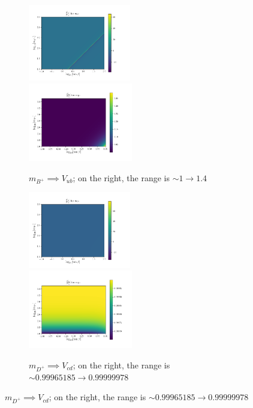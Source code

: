\documentclass[11pt]{article}
\begin{document}
\begin{figure}[H]
    \centering
    \begin{subfigure}[b]{\textwidth}
        \includegraphics[width=0.49\textwidth]{heatmaps/mB-rH0.png}
        \includegraphics[width=0.5\textwidth]{heatmaps/mB-rH1.png}
        \caption{$m_{B^+} \implies V_{ub}$; on the right, the range is $\sim1\to1.4$}
    \end{subfigure}
    \begin{subfigure}[b]{\textwidth}
        \includegraphics[width=0.49\textwidth]{heatmaps/mD-rH0.png}
        \includegraphics[width=0.5\textwidth]{heatmaps/mD-rH1.png}
        \caption{$m_{D^+} \implies V_{cd}$; on the right, the range is $\sim0.99965185\to0.99999978$}
    \end{subfigure}
\end{figure}
\end{document}
